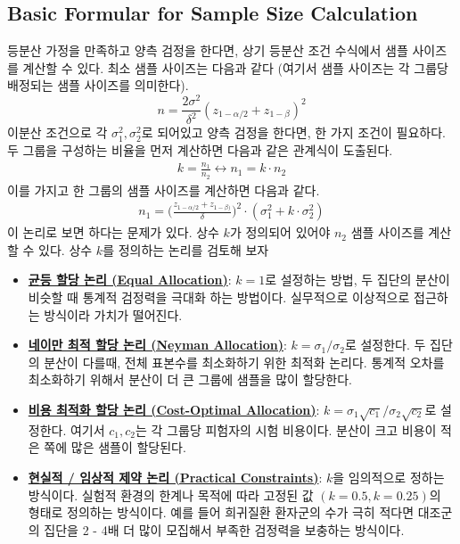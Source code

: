 \subsection{Basic Formular for Sample Size Calculation}
등분산 가정을 만족하고 양측 검정을 한다면, 상기 등분산 조건 수식에서 샘플 사이즈를 계산할 수 있다. 최소 샘플 사이즈는 다음과 같다 (여기서 샘플 사이즈는 각 그룹당 배정되는 샘플 사이즈를 의미한다).  
    \begin{equation*}
        n = \frac{2\sigma^2}{\delta^2}(z_{1-\alpha/2} + z_{1-\beta})^2
    \end{equation*}
이분산 조건으로 각 $\sigma^2_1, \sigma^2_2$로 되어있고 양측 검정을 한다면, 한 가지 조건이 필요하다. 두 그룹을 구성하는 비율을 먼저 계산하면 다음과 같은 관계식이 도출된다. 
    \begin{align*}
        k = \frac{n_1}{n_2} \longleftrightarrow n_1 = k\cdot n_2
    \end{align*}
이를 가지고 한 그룹의 샘플 사이즈를 계산하면 다음과 같다. 
    \begin{align*}
        n_1 = \Big(\frac{z_{1-\alpha/2} + z_{1-\beta)}}{\delta}\Big)^2\cdot(\sigma^2_1 + k\cdot\sigma^2_2)
    \end{align*}
이 논리로 보면 \uline{}하다는 문제가 있다. 상수 $k$가 정의되어 있어야 $n_2$ 샘플 사이즈를 계산할 수 있다. 상수 $k$를 정의하는 논리를 검토해 보자
    \begin{tcolorbox}[arc=4 mm, colback=yellow!5, colframe=black, boxrule=0.2 mm]
        \begin{itemize}[leftmargin=1.5em]
            \item \uline{\textbf{균등 할당 논리 (Equal Allocation)}}: $k = 1$로 설정하는 방법, 두 집단의 분산이 비슷할 때 통계적 검정력을 극대화 하는 방법이다. 실무적으로 이상적으로 접근하는 방식이라 가치가 떨어진다. 
            
            \item \uline{\textbf{네이만 최적 할당 논리 (Neyman Allocation)}}: $k=\sigma_1/\sigma_2$로 설정한다. 두 집단의 분산이 다를때, 전체 표본수를 최소화하기 위한 최적화 논리다. 통계적 오차를 최소화하기 위해서 분산이 더 큰 그룹에 샘플을 많이 할당한다. 

            \item \uline{\textbf{비용 최적화 할당 논리 (Cost-Optimal Allocation)}}: $k = \sigma_1\sqrt{c_1}/\sigma_2\sqrt{c_2}$로 설정한다. 여기서 $c_1, c_2$는 각 그룹당 피험자의 시험 비용이다. 분산이 크고 비용이 적은 쪽에 많은 샘플이 할당된다.  
            
            \item \uline{\textbf{현실적 / 임상적 제약 논리 (Practical Constraints)}}: $k$을 임의적으로 정하는 방식이다. 실험적 환경의 한계나 목적에 따라 고정된 값 $(k=0.5, k=0.25)$의 형태로 정의하는 방식이다. 예를 들어 희귀질환 환자군의 수가 극히 적다면 대조군의 집단을 2 - 4배 더 많이 모집해서 부족한 검정력을 보충하는 방식이다. 
        \end{itemize}
    \end{tcolorbox}